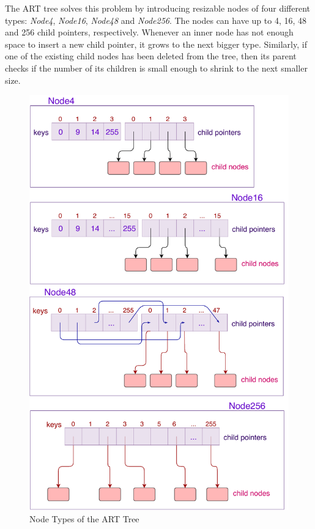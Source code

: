 The ART tree solves this problem by introducing resizable nodes of four different types: \textit{Node4}, \textit{Node16}, \textit{Node48} and \textit{Node256}. The nodes can have up to 4, 16, 48 and 256 child pointers, respectively. Whenever an inner node has not enough space to insert a new child pointer, it grows to the next bigger type. Similarly, if one of the existing child nodes has been deleted from the tree, then its parent checks if the number of its children is small enough to shrink to the next smaller size. 

\begin{figure}[h]
\centering
\includegraphics[width=0.8\linewidth]{figures/art-nodes}
\caption{Node Types of the ART Tree}
\label{fig:art-nodes}
\end{figure}

